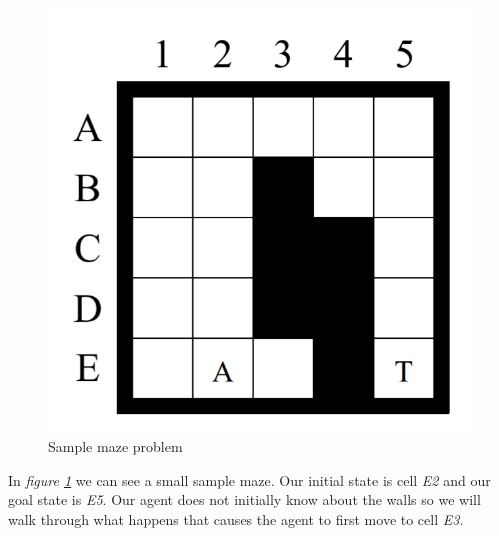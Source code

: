 \begin{figure}[ht]
  \centering
  \includegraphics[width=0.35\linewidth]{Report/Part1/maze.PNG}  
\caption{Sample maze problem}
\label{samplemaze}
\end{figure}

In \emph{figure \ref{samplemaze}} we can see a small sample maze. Our initial state is cell \emph{E2} and our goal state is \emph{E5}. Our agent does not initially know about the walls so we will walk through what happens that causes the agent to first move to cell \emph{E3}.
